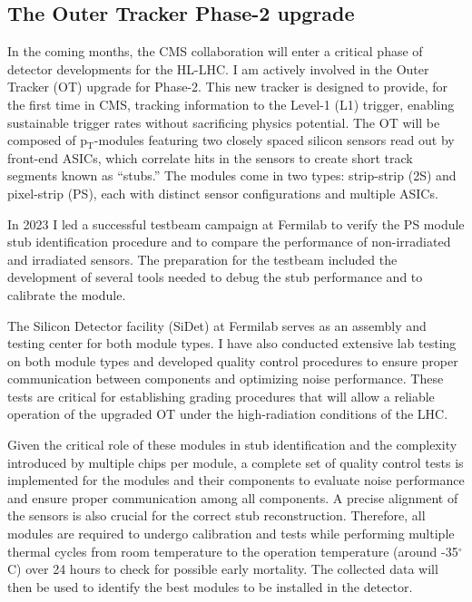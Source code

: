 {\begin{flushleft}
\subsection{The Outer Tracker Phase-2 upgrade}
\vspace{\baselineskip}
In the coming months, the CMS collaboration will enter a critical phase of detector developments for the HL-LHC. I am actively involved in the Outer Tracker (OT) upgrade for Phase-2. This new tracker is designed to provide, for the first time in CMS, tracking information to the Level-1 (L1) trigger, enabling sustainable trigger rates without sacrificing physics potential. The OT will be composed of p$_{\mathrm{T}}$-modules featuring two closely spaced silicon sensors read out by front-end ASICs, which correlate hits in the sensors to create short track segments known as ``stubs.'' The modules come in two types: strip-strip (2S) and pixel-strip (PS), each with distinct sensor configurations and multiple ASICs.

In 2023 I led a successful testbeam campaign at Fermilab to verify the PS module stub identification procedure and to compare the performance of non-irradiated and irradiated sensors. The preparation for the testbeam included the development of several tools needed to debug the stub performance and to calibrate the module.

The Silicon Detector facility (SiDet) at Fermilab serves as an assembly and testing center for both module types. I have also conducted extensive lab testing on both module types and developed quality control procedures to ensure proper communication between components and optimizing noise performance. These tests are critical for establishing grading procedures that will allow a reliable operation of the upgraded OT under the high-radiation conditions of the LHC. 

Given the critical role of these modules in stub identification and the complexity introduced by multiple chips per module, a complete set of quality control tests is implemented for the modules and their components to evaluate noise performance and ensure proper communication among all components. A precise alignment of the sensors is also crucial for the correct stub reconstruction. Therefore, all modules are required to undergo calibration and tests while performing multiple thermal cycles from room temperature to the operation temperature (around -35$^{\circ}$C) over 24 hours to check for possible early mortality. The collected data will then be used to identify the best modules to be installed in the detector. 


\end{flushleft}}
